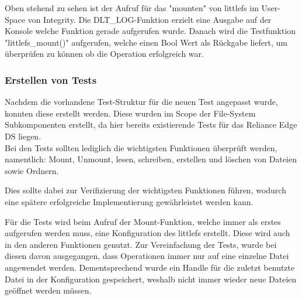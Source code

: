 Oben stehend zu sehen ist der Aufruf für das "mounten" von littlefs im User-Space von Integrity.
Die DLT\_LOG-Funktion erzielt eine Ausgabe auf der Konsole welche Funktion gerade aufgerufen wurde.
Danach wird die Testfunktion "littlefs\_mount()" aufgerufen, welche einen Bool Wert als Rückgabe liefert,
um überprüfen zu können ob die Operation erfolgreich war.

\subsubsection{Erstellen von Tests}
Nachdem die vorhandene Test-Struktur für die neuen Test angepasst wurde, konnten diese erstellt werden.
Diese wurden im Scope der File-System Subkomponenten erstellt, da hier bereits existierende Tests für das Reliance Edge \acl{DS} liegen.\\

Bei den Tests sollten lediglich die wichtigsten Funktionen überprüft werden, namentlich:
Mount, Unmount, lesen, schreiben, erstellen und löschen von Dateien sowie Ordnern.

Dies sollte dabei zur Verifizierung der wichtigsten Funktionen führen, wodurch eine spätere erfolgreiche Implementierung gewährleistet werden kann.

Für die Tests wird beim Aufruf der Mount-Funktion, welche immer als erstes aufgerufen werden muss, eine Konfiguration des littlefs erstellt.
Diese wird auch in den anderen Funktionen genutzt.
Zur Vereinfachung der Tests, wurde bei diesen davon ausgegangen, dass Operationen immer nur auf eine einzelne Datei angewendet werden.
Dementsprechend wurde ein Handle für die zuletzt benutzte Datei in der Konfiguration gespeichert, weshalb nicht immer wieder neue Dateien geöffnet werden müssen.\\

